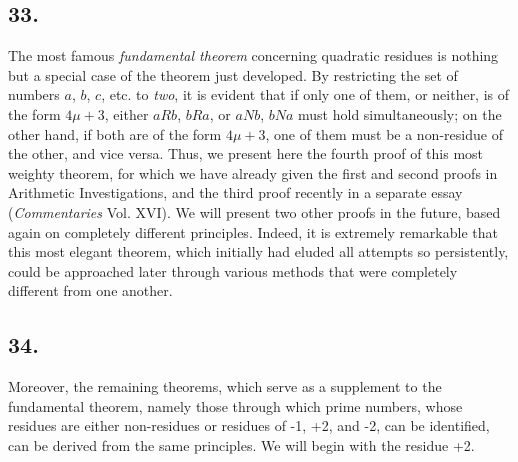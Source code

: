 \documentclass[twoside,12pt, showframe]{memoir}
\begin{document}
\subsection*{33.}

The most famous \textit{fundamental theorem} concerning quadratic residues is nothing but a special case of the theorem just developed. By restricting the set of numbers \(a\), \(b\), \(c\), etc. to \textit{two}, it is evident that if only one of them, or neither, is of the form \(4 \mu+3\), either \(a R b\), \(b R a\), or \(a N b\), \(b N a\) must hold simultaneously; on the other hand, if both are of the form \(4 \mu+3\), one of them must be a non-residue of the other, and vice versa. Thus, we present here the fourth proof of this most weighty theorem, for which we have already given the first and second proofs in Arithmetic Investigations, and the third proof recently in a separate essay (\textit{Commentaries} Vol. XVI). We will present two other proofs in the future, based again on completely different principles. Indeed, it is extremely remarkable that this most elegant theorem, which initially had eluded all attempts so persistently, could be approached later through various methods that were completely different from one another.
%

\subsection*{34.}

Moreover, the remaining theorems, which serve as a supplement to the fundamental theorem, namely those through which prime numbers, whose residues are either non-residues or residues of -1, +2, and -2, can be identified, can be derived from the same principles. We will begin with the residue +2.
%
\end{document}
